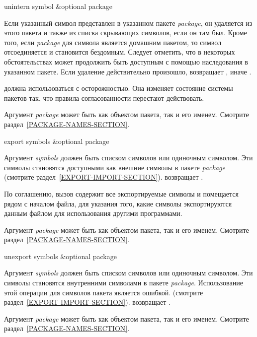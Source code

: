 \begin{defun}[Функция]
unintern symbol &optional package

Если указанный символ представлен в указанном пакете \emph{package}, он
удаляется из этого пакета и также из списка скрывающих символов, если он там
был. Кроме того, если \emph{package} для символа является домашним пакетом, то
символ отсоединяется и становится бездомным.
Следует отметить, что в некоторых обстоятельствах может продолжить быть
доступным с помощью наследования в указанном пакете.
Если удаление действительно произошло,  возвращает {\true}, иначе
{\false}.

 должна использоваться с осторожностью. Она изменяет состояние
системы пакетов так, что правила согласованности перестают действовать.

Аргумент \emph{package} может быть как объектом пакета, так и его
именем. Смотрите раздел~\ref{PACKAGE-NAMES-SECTION}.
\end{defun}

\begin{defun}[Функция]
export symbols &optional package

Аргумент \emph{symbols} должен быть списком символов или одиночным
символом. Эти символы становятся доступными как внешние символы в пакете
\emph{package} (смотрите раздел~\ref{EXPORT-IMPORT-SECTION}).
 возвращает {\true}.

По соглашению, вызов  содержит все экспортируемые символы и
помещается рядом с началом файла, для указания того, какие символы
экспортируются данным файлом для использования другими программами. 

Аргумент \emph{package} может быть как объектом пакета, так и его
именем. Смотрите раздел~\ref{PACKAGE-NAMES-SECTION}.
\end{defun}

\begin{defun}[Функция]
unexport symbols &optional package

Аргумент \emph{symbols} должен быть списком символов или одиночным символом. Эти
символы становятся внутренними символами в пакете \emph{package}. 
Использование этой операции для символов пакета  является ошибкой.
(смотрите раздел~\ref{EXPORT-IMPORT-SECTION}).
 возвращает {\true}.

Аргумент \emph{package} может быть как объектом пакета, так и его
именем. Смотрите раздел~\ref{PACKAGE-NAMES-SECTION}.
\end{defun}

